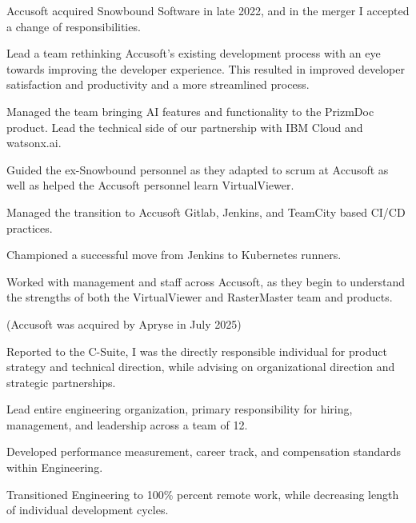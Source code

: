 \documentclass[letterpaper,10pt]{article}
\begin{document}
  \begin{resume_list}
    \item Accusoft acquired Snowbound Software in late 2022, and in the merger I accepted a change of responsibilities.
	\item Lead a team rethinking Accusoft's existing development process with an eye towards improving the developer experience. This resulted in improved developer satisfaction and productivity and a more streamlined process.
    \item Managed the team bringing AI features and functionality to the PrizmDoc product. Lead the technical side of our partnership with IBM Cloud and watsonx.ai.
    \item Guided the ex-Snowbound personnel as they adapted to scrum at Accusoft as well as helped the Accusoft personnel learn VirtualViewer.
    \item Managed the transition to Accusoft Gitlab, Jenkins, and TeamCity based CI/CD practices.
	\item Championed a successful move from Jenkins to Kubernetes runners.
    \item Worked with management and staff across Accusoft, as they begin to understand the strengths of both the VirtualViewer and RasterMaster team and products.
    \item (Accusoft was acquired by Apryse in July 2025)
  \end{resume_list}

  \begin{resume_list}
    \item Reported to the C-Suite, I was the directly responsible individual for product strategy and technical direction, while advising on organizational direction and strategic partnerships.
    \item Lead entire engineering organization, primary responsibility for hiring, management, and leadership across a team of 12.
    \item Developed performance measurement, career track, and compensation standards within Engineering.
    \item Transitioned Engineering to 100\% percent remote work, while decreasing length of individual development cycles.
  \end{resume_list}
     
\end{document}
